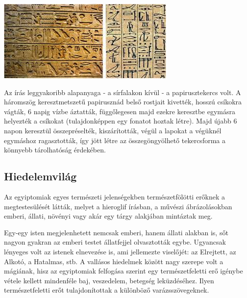 	\begin{tcolorbox}[enhanced,colframe=gray!50!white,
		colbacktitle=gray!15!white,
		coltitle=gray!50!black,
		borderline={0.5mm}{0mm}{gray!15!white},
		borderline={0.5mm}{0mm}{gray!50!white,dashed},
		attach boxed title to top center={yshift=-2mm},
		boxed title style={boxrule=0.4pt},
		title=A hieroglif írás]{
			\includegraphics[width=1.0\linewidth]{images/01/hieroglifa}}
	\end{tcolorbox}

	Az írás leggyakoribb alapanyaga - a sírfalakon kívül - a papirusztekercs volt. A háromszög keresztmetszetű papirusznád belső rostjait kivették, hosszú csíkokra vágták, 6 napig vízbe áztatták, függőlegesen majd ezekre keresztbe egymásra helyezték a csíkokat (tulajdonképpen egy fonatot hoztak létre). Majd újabb 6 napon keresztül összepréselték, kiszárították, végül a lapokat a végüknél egymáshoz ragasztották, így jött létre az összegöngyölhető tekercsforma a könnyebb tárolhatóság érdekében.
	

\subsection*{Hiedelemvilág}

Az egyiptomiak egyes természeti jelenségekben természetfölötti erőknek a megtestesülését látták, melyet a hieroglif írásban, a művészi ábrázolásokban emberi, állati, növényi vagy akár egy tárgy alakjában mintáztak meg. 

Egy-egy isten megjelenhetett nemcsak emberi, hanem állati alakban is, sőt nagyon gyakran az emberi testet állatfejjel olvasztották egybe. Ugyancsak lényeges volt az istenek elnevezése is, ami jellemezte viselőjét: az Elrejtett, az Alkotó, a Hatalmas, stb. A vallásos hiedelmek között nagy szerepe volt a mágiának, hisz az egyiptomiak felfogása szerint egy természetfeletti erő igénybe vétele kellett mindenféle baj, veszedelem, betegség leküzdéséhez. Ilyen természetfeletti erőt tulajdonítottak a különböző varázsszövegeknek.

